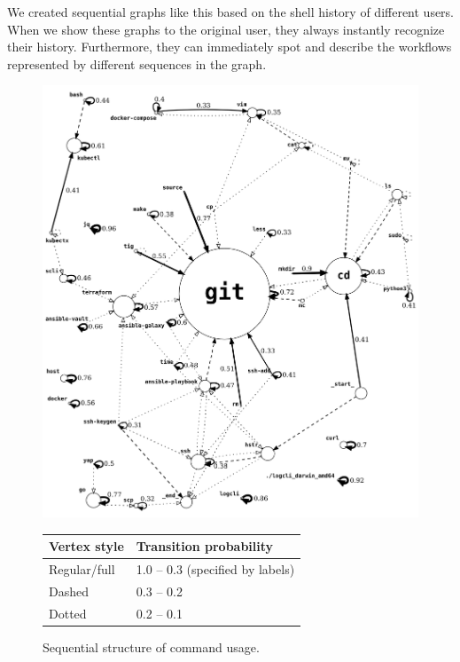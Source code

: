 \documentclass[thesis=M,english]{FITthesis}[2012/10/20]
\newcommand{\tmpframe}[1]{\fbox{#1}}
\renewcommand{\tmpframe}[1]{#1}
\begin{document}
We created sequential graphs like this based on the shell history of different users. When we show these graphs to the original user, they always instantly recognize their history. Furthermore, they can immediately spot and describe the workflows represented by different sequences in the graph.

\begin{figure}

\tmpframe{\includegraphics[width=\linewidth]{figures/appendix/graph_cmd-sequence_41_0-1_crop.png}}
\centering
\begin{tabular}{|l|l|}
\hline
Vertex style & Transition probability            \\\hline
Regular/full     & 1.0 -- 0.3 (specified by labels) \\
Dashed      & 0.3 -- 0.2                         \\
Dotted      & 0.2 -- 0.1                         \\
\hline
\end{tabular}

\caption{Sequential structure of command usage.}
\label{seq-graph}
\end{figure}
\end{document}
